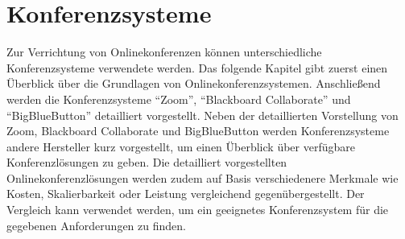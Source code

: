\chapter{Konferenzsysteme}
Zur Verrichtung von Onlinekonferenzen können unterschiedliche Konferenzsysteme verwendete werden.
Das folgende Kapitel gibt zuerst einen Überblick über die Grundlagen von Onlinekonferenzsystemen.
Anschließend werden die Konferenzsysteme \enquote{Zoom}, \enquote{Blackboard Collaborate} und \enquote{BigBlueButton} detailliert vorgestellt.
Neben der detaillierten Vorstellung von Zoom, Blackboard Collaborate und  BigBlueButton werden Konferenzsysteme andere Hersteller kurz vorgestellt, um einen Überblick über verfügbare Konferenzlösungen zu geben.
Die detailliert vorgestellten Onlinekonferenzlösungen werden zudem auf Basis verschiedenere Merkmale wie Kosten, Skalierbarkeit oder Leistung vergleichend gegenübergestellt.
Der Vergleich kann verwendet werden, um ein geeignetes Konferenzsystem für die gegebenen Anforderungen zu finden.

